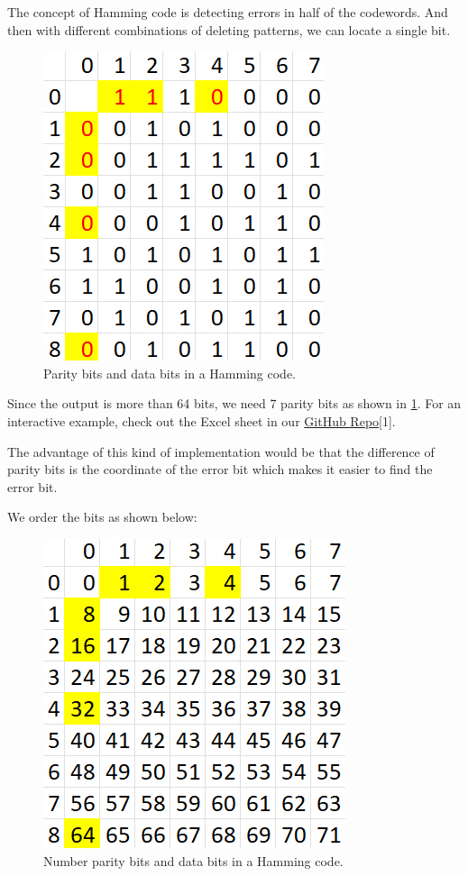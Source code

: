 \documentclass[conference]{IEEEtran}
\begin{document}
The concept of Hamming code is detecting errors in half of the codewords. And
then with different combinations of deleting patterns, we can locate a single
bit.

\begin{figure}[htbp]
  \centerline{\includegraphics{Images/Hamming_example.png}}
  \caption{Parity bits and data bits in a Hamming code.}
  \label{fig_2}
\end{figure}

Since the output is more than 64 bits, we need 7 parity bits as shown in
\ref{fig_2}. For an interactive example, check out the Excel sheet in our
\href{https://github.com/luckunately/ELEC433-Projects}{GitHub Repo}[1]. %

The advantage of this kind of implementation would be that the difference of
parity bits is the coordinate of the error bit which makes it easier to find
the error bit.

We order the bits as shown below:

\begin{figure}[htbp]
  \centerline{\includegraphics{Images/Hamming_bits_order.png}}
  \caption{Number parity bits and data bits in a Hamming code.}
  \label{fig_3}
\end{figure}
\end{document}
